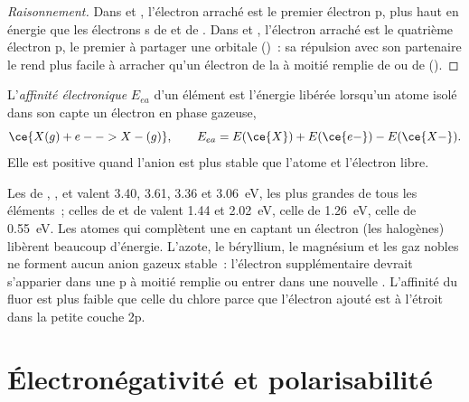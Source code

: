 \begin{proof}[Raisonnement]
Dans  et , l'électron arraché est le premier électron p,
plus haut en énergie que les électrons s de  et de . Dans
 et , l'électron arraché est le quatrième électron p, le
premier à partager une orbitale ()~: sa répulsion avec son
partenaire le rend plus facile à arracher qu'un électron de la
 à moitié remplie de  ou de  ().
\end{proof}

\begin{definition}\label{def:b1:periodicity:electron-affinity}
L'\emph{affinité électronique} $E_{ea}$ d'un
élément est l'énergie libérée lorsqu'un atome isolé dans son  capte un électron en phase gazeuse,
\[
  \ce{X(g) + e- -> X-(g)}, \qquad E_{ea} = E(\ce{X}) + E(\ce{e-}) - E(\ce{X-}) .
\]
Elle est positive quand l'anion est plus stable que l'atome et
l'électron libre.
\end{definition}

\begin{example}\label{ex:b1:periodicity:ea}
Les  de , ,  et  valent
3.40, 3.61, 3.36 et \qty{3.06}{eV}, les plus grandes de tous les
éléments~; celles de  et de  valent 1.44 et
\qty{2.02}{eV}, celle de  \qty{1.26}{eV}, celle de 
\qty{0.55}{eV}. Les atomes qui complètent une  en captant un
électron (les halogènes) libèrent beaucoup d'énergie. L'azote, le
béryllium, le magnésium et les gaz nobles ne forment aucun anion gazeux
stable~: l'électron supplémentaire devrait s'apparier dans une
 p à moitié remplie ou entrer dans une nouvelle .
L'affinité du fluor est plus faible que celle du chlore parce que
l'électron ajouté est à l'étroit dans la petite couche 2p.
\end{example}

\section{Électronégativité et polarisabilité}

